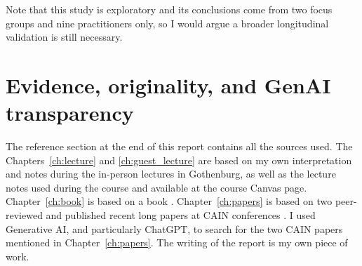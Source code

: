 \documentclass[11pt]{article}
\begin{document}
Note that this study is exploratory and its conclusions come from two focus groups and nine practitioners only, so I would argue a broader longitudinal validation is still necessary.

\section{Evidence, originality, and GenAI transparency}
The reference section at the end of this report contains all the sources used. The Chapters~\ref{ch:lecture} and \ref{ch:guest_lecture} are based on my own interpretation and notes during the in-person lectures in Gothenburg, as well as the lecture notes used during the course and available at the course Canvas page. Chapter~\ref{ch:book} is based on a book \citep{Kastner2025Machine}. Chapter~\ref{ch:papers} is based on two peer-reviewed and published recent long papers at CAIN conferences \citep{paper1, paper2}. I used Generative AI, and particularly ChatGPT, to search for the two CAIN papers mentioned in Chapter~\ref{ch:papers}. The writing of the report is my own piece of work.



\end{document}
